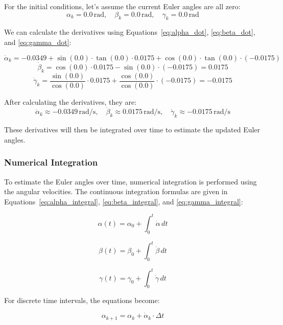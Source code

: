 \documentclass[12pt]{article}
\begin{document}
For the initial conditions, let's assume the current Euler angles are all zero:
\[
\alpha_k = 0.0 \, \text{rad}, \quad \beta_k = 0.0 \, \text{rad}, \quad \gamma_k = 0.0 \, \text{rad}
\]

We can calculate the derivatives using Equations~\eqref{eq:alpha_dot}, \eqref{eq:beta_dot}, and \eqref{eq:gamma_dot}:

\[
\dot{\alpha}_k = -0.0349 + \sin(0.0) \cdot \tan(0.0) \cdot 0.0175 + \cos(0.0) \cdot \tan(0.0) \cdot (-0.0175)
\]
\[
\dot{\beta}_k = \cos(0.0) \cdot 0.0175 - \sin(0.0) \cdot (-0.0175) = 0.0175
\]
\[
\dot{\gamma}_k = \frac{\sin(0.0)}{\cos(0.0)} \cdot 0.0175 + \frac{\cos(0.0)}{\cos(0.0)} \cdot (-0.0175) = -0.0175
\]

After calculating the derivatives, they are:
\[
\dot{\alpha}_k \approx -0.0349 \, \text{rad/s}, \quad \dot{\beta}_k \approx 0.0175 \, \text{rad/s}, \quad \dot{\gamma}_k \approx -0.0175 \, \text{rad/s}
\]

These derivatives will then be integrated over time to estimate the updated Euler angles.

\subsubsection{Numerical Integration}
To estimate the Euler angles over time, numerical integration is performed using the angular velocities. The continuous integration formulas are given in Equations~\eqref{eq:alpha_integral}, \eqref{eq:beta_integral}, and \eqref{eq:gamma_integral}:

\begin{equation}
\label{eq:alpha_integral}
\alpha(t) = \alpha_0 + \int_0^t \dot{\alpha} \, dt
\end{equation}

\begin{equation}
\label{eq:beta_integral}
\beta(t) = \beta_0 + \int_0^t \dot{\beta} \, dt
\end{equation}

\begin{equation}
\label{eq:gamma_integral}
\gamma(t) = \gamma_0 + \int_0^t \dot{\gamma} \, dt
\end{equation}

For discrete time intervals, the equations become:

\begin{equation}
\label{eq:alpha_discrete}
\alpha_{k+1} = \alpha_k + \dot{\alpha}_k \cdot \Delta t
\end{equation}
\end{document}

